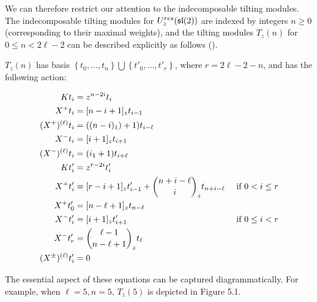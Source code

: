 We can therefore restrict our attention to the indecomposable tilting modules.
The indecomposable tilting modules for $U_z^{res}(\mathfrak{sl}(2))$ are indexed by integers $n
\geq 0$ (corresponding to their maximal weights), and the tilting modules
$T_z(n)$ for $0 \leq n < 2\ell - 2$ can be described explicitly as follows
(\cite{CP}). 

$T_z(n)$ has basis $\left\{ t_0, \ldots, t_n \right\} \bigcup \left\{ t'_0,
    \ldots, t'_{r} \right\}$, where $r = 2\ell - 2 - n$, and has the following
    action:

\begin{align}
    Kt_i &= z^{n-2i} t_i \\
    X^+ t_i &= [n-i+1]_z t_{i-1} \\
    (X^+)^{(\ell)} t_i &= ((n-i)_1) + 1) t_{i-\ell} \\
    X^-t_i &= [i+1]_z t_{i+1} \\
    (X^-)^{(\ell)} t_i &= (i_1 + 1) t_{i+\ell} \\
    Kt'_i &= z^{r-2i} t'_i \\
    X^+ t'_i &= [r-i+1]_z t'_{i-1}  + \dbinom{n + i - \ell}{i}_z t_{n+i-\ell} &\text{ if $0 < i \leq r$}\\
    X^+ t'_0 &= [n - \ell + 1]_z t_{n-\ell} \\
    X^-t'_i &= [i+1]_z t'_{i+1} &\text{ if $0 \leq i < r$}\\
    X^- t'_r &= \dbinom{\ell - 1}{n - \ell + 1}_z t_\ell \\
    (X^\pm)^{(\ell)} t'_i  &= 0
\end{align}

The essential aspect of these equations can be captured diagrammatically. For
example, when $\ell = 5, n = 5$, $T_z(5)$ is depicted in Figure 5.1.

